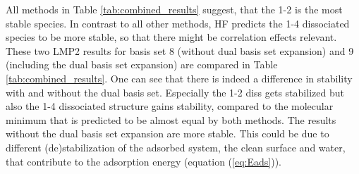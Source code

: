 \documentclass[11pt,DIV=13,BCOR=5mm,a4paper,headinclude]{scrbook}
\begin{document}
All methods in Table \ref{tab:combined_results} suggest, that the 1-2 is the most stable species.
In contrast to all other methods, HF predicts the 1-4 dissociated species to be more stable, so that there might be correlation effects relevant.
These two LMP2 results for basis set 8 (without dual basis set expansion) and 9 (including the dual basis set expansion) are compared in Table \ref{tab:combined_results}. %
One can see that there is indeed a difference in stability with and without the dual basis set.
Especially the 1-2 diss gets stabilized but also the 1-4 dissociated structure gains stability, compared to the molecular minimum that is predicted to be almost equal by both methods.
The results without the dual basis set expansion are more stable.
This could be due to different (de)stabilization of the adsorbed system, the clean surface and water, that contribute to the adsorption energy (equation (\ref{eq:Eads})). %
\end{document}
